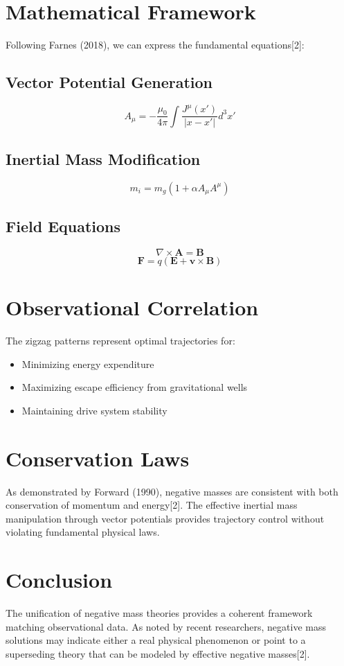 \documentclass[12pt]{article}
\begin{document}
\section{Mathematical Framework}
Following Farnes (2018), we can express the fundamental equations[2]:

\subsection{Vector Potential Generation}
\[
A_\mu = -\frac{\mu_0}{4\pi} \int \frac{J^\mu(x')}{|x-x'|} d^3x'
\]

\subsection{Inertial Mass Modification}
\[
m_i = m_g(1 + \alpha A_\mu A^\mu)
\]

\subsection{Field Equations}
\[
\nabla \times \mathbf{A} = \mathbf{B}
\]
\[
\mathbf{F} = q(\mathbf{E} + \mathbf{v} \times \mathbf{B})
\]

\section{Observational Correlation}
The zigzag patterns represent optimal trajectories for:
\begin{itemize}
    \item Minimizing energy expenditure
    \item Maximizing escape efficiency from gravitational wells
    \item Maintaining drive system stability
\end{itemize}

\section{Conservation Laws}
As demonstrated by Forward (1990), negative masses are consistent with both conservation of momentum and energy[2]. The effective inertial mass manipulation through vector potentials provides trajectory control without violating fundamental physical laws.

\section{Conclusion}
The unification of negative mass theories provides a coherent framework matching observational data. As noted by recent researchers, negative mass solutions may indicate either a real physical phenomenon or point to a superseding theory that can be modeled by effective negative masses[2].
\end{document}
